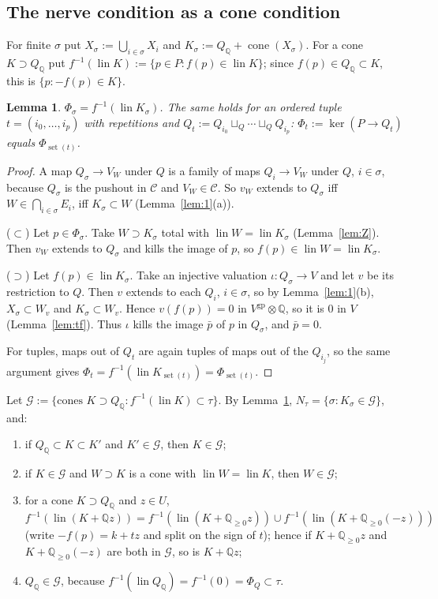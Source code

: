 \documentclass[11pt]{article}
\newtheorem{lemma}[theorem]{Lemma}
\theoremstyle{definition}
\theoremstyle{remark}
\newcommand{\QQ}{\mathbb{Q}}
\newcommand{\cC}{\mathcal{C}}
\newcommand{\gp}{\mathrm{gp}}
\newcommand{\lin}{\operatorname{lin}}
\newcommand{\cone}{\operatorname{cone}}
\newcommand{\cG}{\mathcal{G}}
\newcommand{\set}{\operatorname{set}}
\newcommand{\Qrat}{Q_{\QQ}}
\begin{document}
\subsection{The nerve condition as a cone condition}
For finite $\sigma$ put $X_\sigma:=\bigcup_{i\in\sigma}X_i$ and $K_\sigma:=\Qrat+\cone(X_\sigma)$. For a cone $K\supset\Qrat$ put $f^{-1}(\lin K):=\{p\in P: f(p)\in\lin K\}$; since $f(p)\in\Qrat\subset K$, this is $\{p: -f(p)\in K\}$.

\begin{lemma}\label{lem:2}
$\Phi_\sigma=f^{-1}(\lin K_\sigma)$. The same holds for an ordered tuple $t=(i_0,\dots,i_p)$ with repetitions and $Q_t:=Q_{i_0}\sqcup_Q\cdots\sqcup_Q Q_{i_p}$: $\Phi_t:=\ker(P\to Q_t)$ equals $\Phi_{\set(t)}$.
\end{lemma}
\begin{proof}
A map $Q_\sigma\to V_W$ under $Q$ is a family of maps $Q_i\to V_W$ under $Q$, $i\in\sigma$, because $Q_\sigma$ is the pushout in $\cC$ and $V_W\in\cC$. So $v_W$ extends to $Q_\sigma$ iff $W\in\bigcap_{i\in\sigma}E_i$, iff $K_\sigma\subset W$ (Lemma~\ref{lem:1}(a)).

($\subset$) Let $p\in\Phi_\sigma$. Take $W\supset K_\sigma$ total with $\lin W=\lin K_\sigma$ (Lemma~\ref{lem:Z}). Then $v_W$ extends to $Q_\sigma$ and kills the image of $p$, so $f(p)\in\lin W=\lin K_\sigma$.

($\supset$) Let $f(p)\in\lin K_\sigma$. Take an injective valuation $\iota\colon Q_\sigma\to V$ and let $v$ be its restriction to $Q$. Then $v$ extends to each $Q_i$, $i\in\sigma$, so by Lemma~\ref{lem:1}(b), $X_\sigma\subset W_v$ and $K_\sigma\subset W_v$. Hence $v(f(p))=0$ in $V^{\gp}\otimes\QQ$, so it is $0$ in $V$ (Lemma~\ref{lem:tf}). Thus $\iota$ kills the image $\bar p$ of $p$ in $Q_\sigma$, and $\bar p=0$.

For tuples, maps out of $Q_t$ are again tuples of maps out of the $Q_{i_j}$, so the same argument gives $\Phi_t=f^{-1}(\lin K_{\set(t)})=\Phi_{\set(t)}$.
\end{proof}

Let $\cG:=\{\text{cones }K\supset\Qrat: f^{-1}(\lin K)\subset\tau\}$. By Lemma~\ref{lem:2}, $N_\tau=\{\sigma: K_\sigma\in\cG\}$, and:
\begin{enumerate}[label=(G\arabic*),start=0]
\item if $\Qrat\subset K\subset K'$ and $K'\in\cG$, then $K\in\cG$;
\item if $K\in\cG$ and $W\supset K$ is a cone with $\lin W=\lin K$, then $W\in\cG$;
\item for a cone $K\supset\Qrat$ and $z\in U$, $f^{-1}(\lin(K+\QQ z))=f^{-1}(\lin(K+\QQ_{\ge0}z))\cup f^{-1}(\lin(K+\QQ_{\ge0}(-z)))$ (write $-f(p)=k+tz$ and split on the sign of $t$); hence if $K+\QQ_{\ge0}z$ and $K+\QQ_{\ge0}(-z)$ are both in $\cG$, so is $K+\QQ z$;
\item $\Qrat\in\cG$, because $f^{-1}(\lin\Qrat)=f^{-1}(0)=\Phi_Q\subset\tau$.
\end{enumerate}
\end{document}
